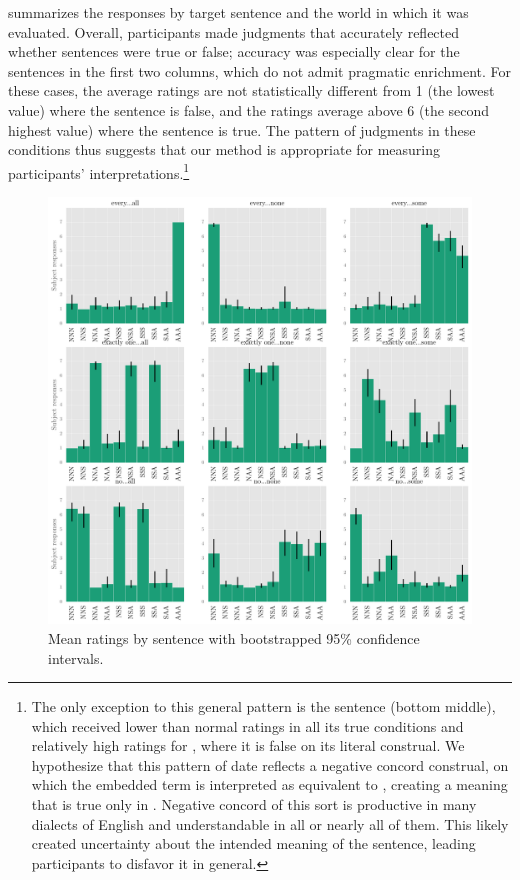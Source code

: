\documentclass[leqno,12pt]{article}
\begin{document}
 summarizes the responses by target sentence
and the world in which it was evaluated. Overall, participants made judgments that accurately reflected whether sentences were true or false; accuracy was
especially clear for the sentences in the first two columns, which do
not admit pragmatic enrichment. For these cases, the average ratings are not
statistically different from 1 (the lowest value) where the sentence
is false, and the ratings average above 6 (the second highest value)
where the sentence is true. The pattern of judgments in these
conditions thus suggests that our method is appropriate for measuring
participants' interpretations.\footnote{The only exception to this general pattern is the sentence  (bottom middle), which received lower than normal
ratings in all its true conditions and relatively high ratings for
, where it is false on its literal construal. We
hypothesize that this pattern of date reflects a
negative concord construal, on which the embedded term is interpreted
as equivalent to , creating a meaning that is
true only in . Negative concord of this sort is productive
in many dialects of English and understandable in all or nearly all of
them. This likely created uncertainty about the intended meaning of
the sentence, leading participants to disfavor it in general.}

\begin{figure}[!ht]
  \centering
  \includegraphics[width=1\textwidth]{fig/basketball-pilot-2-11-14-results-parsed}
  \caption{Mean ratings by sentence with bootstrapped 95\% confidence intervals.}
  \label{fig:exp1-results}
\end{figure}
\end{document}
